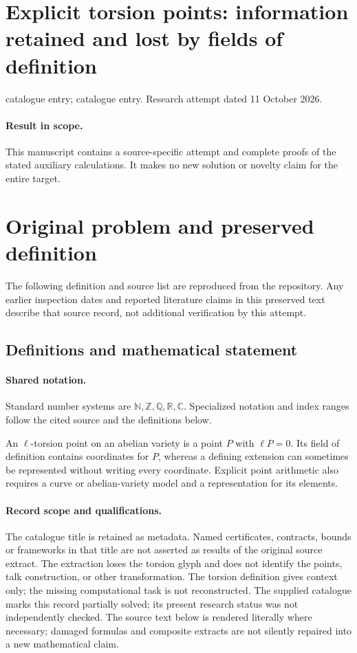 \documentclass[11pt]{article}
\begin{document}
\section*{Explicit torsion points: information retained and lost by fields of definition}
\noindent catalogue entry; catalogue entry. Research attempt dated 11 October 2026.
\paragraph{Result in scope.}This manuscript contains a source-specific attempt and complete proofs of the stated auxiliary calculations. It makes no new solution or novelty claim for the entire target.
\section{Original problem and preserved definition}
The following definition and source list are reproduced from the repository. Any earlier inspection dates and reported literature claims in this preserved text describe that source record, not additional verification by this attempt.
\subsection{Definitions and mathematical statement}

\paragraph{Shared notation.}Standard number systems are $\mathbb N,\mathbb Z,\mathbb Q,\mathbb R,\mathbb C$. Specialized notation and index ranges follow the cited source and the definitions below.


An $\ell$-torsion point on an abelian variety is a point $P$ with $\ell P=0$. Its field of definition contains coordinates for $P$, whereas a defining extension can sometimes be represented without writing every coordinate. Explicit point arithmetic also requires a curve or abelian-variety model and a representation for its elements.
\paragraph{Record scope and qualifications.}
The catalogue title is retained as metadata. Named certificates, contracts, bounds or frameworks in that title are not asserted as results of the original source extract.
The extraction loses the torsion glyph and does not identify the points, talk construction, or other transformation. The torsion definition gives context only; the missing computational task is not reconstructed. The supplied catalogue marks this record partially solved; its present research status was not independently checked.
The source text below is rendered literally where necessary; damaged formulas and composite extracts are not silently repaired into a new mathematical claim.
\end{document}
